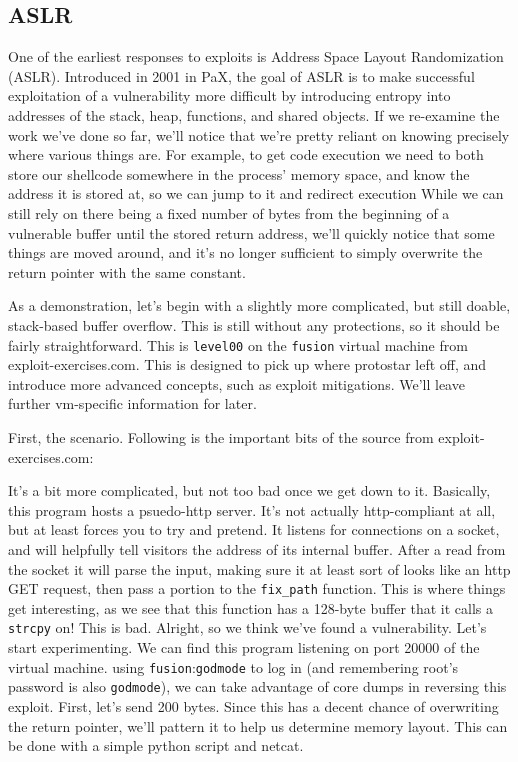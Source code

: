 \subsection{ASLR}

One of the earliest responses to exploits is Address Space Layout Randomization (ASLR).
Introduced in 2001 in PaX, the goal of ASLR is to make successful exploitation
of a vulnerability more difficult by introducing entropy into addresses
of the stack, heap, functions, and shared objects. If we re-examine
the work we've done so far, we'll notice that we're pretty reliant
on knowing precisely where various things are. For example, to get code
execution we need to both store our shellcode somewhere in the
process' memory space, and know the address it is stored at, so
we can jump to it and redirect execution While we can still
rely on there being a fixed number of bytes from the beginning of
a vulnerable buffer until the stored return address, we'll quickly
notice that some things are moved around, and it's no longer
sufficient to simply overwrite the return pointer with the same constant.

As a demonstration, let's begin with a slightly more complicated, but
still doable, stack-based buffer overflow. This is still without
any protections, so it should be fairly straightforward. This is
\texttt{level00} on the \texttt{fusion} virtual machine from exploit-exercises.com.
This is designed to pick up where protostar left off, and introduce
more advanced concepts, such as exploit mitigations. We'll leave
further vm-specific information for later.

First, the scenario. Following is the important bits of the source 
from exploit-exercises.com:



It's a bit more complicated, but not too bad once we get down to it.
Basically, this program hosts a psuedo-http server. It's not
actually http-compliant at all, but at least forces you to try
and pretend. It listens for connections on a socket, and will
helpfully tell visitors the address of its internal buffer.
After a read from the socket it will parse the input, making
sure it at least sort of looks like an http GET request, then
pass a portion to the \texttt{fix\_path} function. This is where 
things get interesting, as we see that this function
has a 128-byte buffer that it calls a \texttt{strcpy} on! This
is bad. Alright, so we think we've found a vulnerability. Let's 
start experimenting. We can find this program listening on
port 20000 of the virtual machine. using \texttt{fusion}:\texttt{godmode}
to log in (and remembering root's password is also \texttt{godmode}), we
can take advantage of core dumps in reversing this exploit.
First, let's send 200 bytes. Since this has a decent chance of 
overwriting the return pointer, we'll pattern it to help us 
determine memory layout. This can be done with a simple python script
and netcat.

